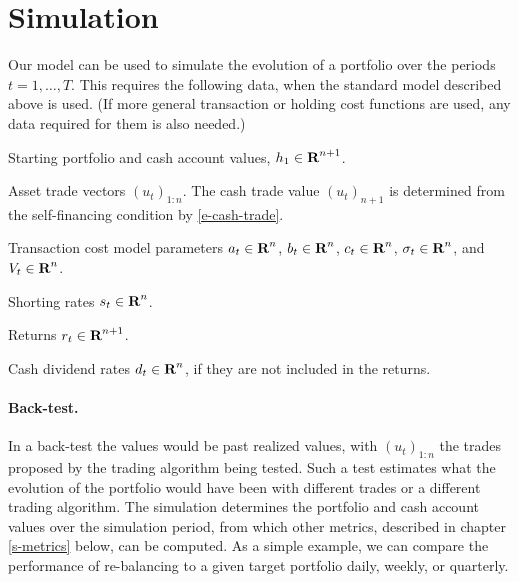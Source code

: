 \documentclass[openany]{article}  %
\begin{document}
\section{Simulation}
Our model can be used to simulate the evolution of a portfolio
over the periods $t=1,\ldots, T$.
This requires the following data, when the standard model described above is used.
(If more general transaction or holding cost functions are used, any data
required for them is also needed.)
\BIT\itemsep -2pt
\item Starting portfolio and cash account values, $h_1\in {\mbox{\bf R}}^{n+1}$.
\item Asset trade vectors $(u_t)_{1:n}$.
The cash trade value $(u_t)_{n+1}$ is determined from the self-financing
condition by \eqref{e-cash-trade}.
\item Transaction cost model parameters $a_t \in {\mbox{\bf R}}^n$,
$b_t \in {\mbox{\bf R}}^n$, $c_t\in {\mbox{\bf R}}^n$,
$\sigma_t \in {\mbox{\bf R}}^n$, and $V_t \in {\mbox{\bf R}}^n$.
\item Shorting rates $s_t\in {\mbox{\bf R}}^n$.
\item Returns $r_t\in {\mbox{\bf R}}^{n+1}$.
\item Cash dividend rates $d_t\in {\mbox{\bf R}}^n$,
if they are not included in the returns.
\EIT

\paragraph{Back-test.}
In a back-test the values would be past realized values,
with $(u_t)_{1:n}$ the trades proposed by the trading algorithm being
tested.  Such a test estimates what the evolution of the portfolio
would have been with different trades or a different trading algorithm.
The simulation determines the portfolio and cash account values
over the simulation period, from which other metrics, described in chapter
\ref{s-metrics}
below, can be computed.
As a simple example, we can compare the performance
of re-balancing to a given target portfolio daily, weekly, or quarterly.
\end{document}
